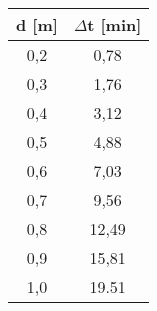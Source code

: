 \begin{table}
	\begin{center}
		\begin{tabular}{c|c}
				   \textbf{d} [m] & \textbf{$\Delta$t} [min] \\ 
		\hline     0,2 &  0,78 \\ 
				   0,3 &  1,76 \\ 
				   0,4 &  3,12 \\ 
				   0,5 &  4,88 \\ 
				   0,6 &  7,03 \\ 
				   0,7 &  9,56 \\ 
				   0,8 & 12,49 \\ 
				   0,9 & 15,81 \\ 
				   1,0 & 19.51 \\  
		\end{tabular} 
	\end{center}
\end{table}

